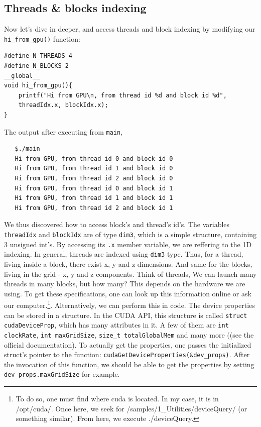 \subsection{Threads \& blocks indexing}
Now let's dive in deeper, and access threads and block indexing by modifying our 
\verb|hi_from_gpu()| function:
\vspace{-0.5cm}
\begin{verbatim}
#define N_THREADS 4
#define N_BLOCKS 2
__global__ 
void hi_from_gpu(){
    printf("Hi from GPU\n, from thread id %d and block id %d", 
    threadIdx.x, blockIdx.x);
}
\end{verbatim}
The output after executing from \verb|main|,
\vspace{-0.5cm}
\begin{verbatim}
   $./main
   Hi from GPU, from thread id 0 and block id 0 
   Hi from GPU, from thread id 1 and block id 0 
   Hi from GPU, from thread id 2 and block id 0 
   Hi from GPU, from thread id 0 and block id 1 
   Hi from GPU, from thread id 1 and block id 1 
   Hi from GPU, from thread id 2 and block id 1 
\end{verbatim}
\vspace{-0.5cm}
We thus discovered how to access block's and thread's id's. The 
variables \verb|threadIdx| and \verb|blockIdx| are of type \verb|dim3|,
which is a simple structure, containing 3 unsigned int's. By accessing 
its \verb|.x| member variable, we are reffering to the 1D indexing. In general, 
threads are indexed using \verb|dim3| type. Thus, for a thread, living inside a block, there exist x, y and z 
dimensions. And same for the blocks, living in the grid - x, y and z components. 
Think of threads, 
We can launch many threads in many blocks, but how many? This depends on 
the hardware we are using.
To get these specifications, one can look up this information online or ask our computer.\footnote{
To do so, one must find where {\selectfont cuda} is located. In my case, it is in 
{\selectfont /opt/cuda/}.
Once here, we seek for {\selectfont /samples/1\_Utilities/deviceQuery/} 
(or something similar). 
From here, we execute {\selectfont ./deviceQuery}.   
}.
Alternatively, we can perform this in code. The device properties can be stored in a structure. In the 
CUDA API, this structure is called \verb|struct cudaDeviceProp|, which has many attributes in it. A few of them are \verb|int clockRate|, \verb|int maxGridSize|, \verb|size_t totalGlobalMem| and many more ((see the official documentation). 
To actually get the properties, one passes the initialized struct's pointer to the function: 
\verb|cudaGetDeviceProperties(&dev_props)|. After the invocation of this function, we should 
be able to get the properties by setting \verb|dev_props.maxGridSize| for example.

